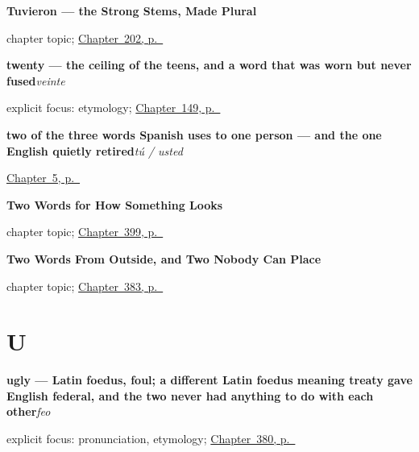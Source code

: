 \noindent\begin{minipage}[t]{\linewidth}
\raggedright
\textbf{Tuvieron --- the Strong Stems, Made Plural}\par
\footnotesize chapter topic; \hyperref[ch:tuvieron]{Chapter~202, p.~\pageref*{ch:tuvieron}}
\end{minipage}\par\smallskip

\noindent\begin{minipage}[t]{\linewidth}
\raggedright
\textbf{twenty — the ceiling of the teens, and a word that was worn but never fused}\enspace\emph{veinte}\par
\footnotesize explicit focus: etymology; \hyperref[ch:spanish-numbers-eleven-to-twenty]{Chapter~149, p.~\pageref*{ch:spanish-numbers-eleven-to-twenty}}
\end{minipage}\par\smallskip

\noindent\begin{minipage}[t]{\linewidth}
\raggedright
\textbf{two of the three words Spanish uses to one person — and the one English quietly retired}\enspace\emph{tú / usted}\par
\footnotesize \hyperref[ch:three-yous]{Chapter~5, p.~\pageref*{ch:three-yous}}
\end{minipage}\par\smallskip

\noindent\begin{minipage}[t]{\linewidth}
\raggedright
\textbf{Two Words for How Something Looks}\par
\footnotesize chapter topic; \hyperref[ch:bonito-y-guapo]{Chapter~399, p.~\pageref*{ch:bonito-y-guapo}}
\end{minipage}\par\smallskip

\noindent\begin{minipage}[t]{\linewidth}
\raggedright
\textbf{Two Words From Outside, and Two Nobody Can Place}\par
\footnotesize chapter topic; \hyperref[ch:guardar-y-dejar]{Chapter~383, p.~\pageref*{ch:guardar-y-dejar}}
\end{minipage}\par\smallskip

\section*{U}

\noindent\begin{minipage}[t]{\linewidth}
\raggedright
\textbf{ugly — Latin foedus, foul; a different Latin foedus meaning treaty gave English federal, and the two never had anything to do with each other}\enspace\emph{feo}\par
\footnotesize explicit focus: pronunciation, etymology; \hyperref[ch:simpatico-y-alegre]{Chapter~380, p.~\pageref*{ch:simpatico-y-alegre}}
\end{minipage}\par\smallskip

